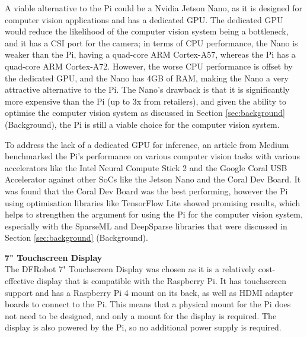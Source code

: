 A viable alternative to the Pi could be a Nvidia Jetson Nano\cite{jetsonnano}, as it is designed for computer vision applications and has a dedicated GPU. The dedicated GPU
would reduce the likelihood of the computer vision system being a bottleneck, and it has a CSI port for the camera; in terms of CPU performance, the Nano is weaker than the Pi,
having a quad-core ARM Cortex-A57, whereas the Pi has a quad-core ARM Cortex-A72\cite{pi4}. However, the worse CPU performance is offset by the dedicated GPU, and the Nano has 4GB of RAM, 
making the Nano a very attractive alternative to the Pi. The Nano's drawback is that it is significantly more expensive than the Pi (up to 3x from retailers), and
given the ability to optimise the computer vision system as discussed in Section \ref*{sec:background} (Background), the Pi is still
a viable choice for the computer vision system.

To address the lack of a dedicated GPU for inference, an article from Medium\cite{benchmarks} benchmarked the Pi's performance on various computer vision tasks with 
various accelerators like the Intel Neural Compute Stick 2 and the Google Coral USB Accelerator against other SoCs like the Jetson Nano and the Coral Dev Board. 
It was found that the Coral Dev Board was the best performing, however the Pi using optimisation libraries like TensorFlow Lite showed  promising results, which
helps to strengthen the argument for using the Pi for the computer vision system, especially with the SparseML and DeepSparse libraries that were discussed in Section \ref*{sec:background} (Background).

\vspace{1em}
\noindent
\textbf{7" Touchscreen Display} \\
The DFRobot 7" Touchscreen Display was chosen as it is a relatively cost-effective display that is compatible with the Raspberry Pi.
It has touchscreen support and has a Raspberry Pi 4 mount on its back, as well as HDMI adapter boards to connect to the Pi.
This means that a physical mount for the Pi does not need to be designed, and only a mount for the display is required. The display is also powered by the Pi,
so no additional power supply is required. 

